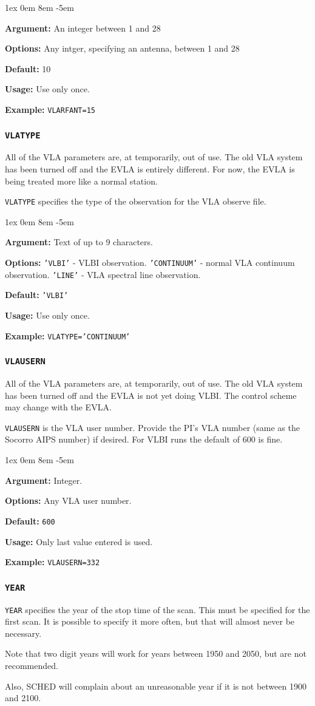 \documentclass{report}
\newcommand{\rcwbox}[5]{
  \begin{list}{}{\parsep 1ex  \itemsep 0em
                 \leftmargin 8em  \itemindent -5em }
    \item {\bf Argument:} #1
    \item {\bf Options:}  #2
    \item {\bf Default:}  #3
    \item {\bf Usage:}    #4
    \item {\bf Example:}  #5
  \end{list}
}
\begin{document}
\rcwbox
{An integer between 1 and 28}
{Any intger, specifying an antenna, between 1 and 28}
{10}
{Use only once.}
{{\tt VLARFANT=15}}



\subsubsection{\label{MP:VLATYPE}{\tt VLATYPE}}

All of the VLA parameters are, at temporarily, out of use.  The old
VLA system has been turned off and the EVLA is entirely different.
For now, the EVLA is being treated more like a normal station.

{\tt VLATYPE} specifies the type of the observation
for the VLA observe file.

\rcwbox
{Text of up to 9 characters.}
{{\tt 'VLBI'}      - VLBI observation.
 {\tt 'CONTINUUM'} - normal VLA continuum observation.
 {\tt 'LINE'}      - VLA spectral line observation.}
{{\tt 'VLBI'}}
{Use only once.}
{{\tt VLATYPE='CONTINUUM'}}


\subsubsection{\label{MP:VLAUSERN}{\tt VLAUSERN}}

All of the VLA parameters are, at temporarily, out of use.  The old
VLA system has been turned off and the EVLA is not yet doing VLBI.
The control scheme may change with the EVLA.

{\tt VLAUSERN} is the VLA user number. Provide the PI's VLA number
(same as the Socorro AIPS number) if desired. For VLBI runs the
default of 600 is fine.

\rcwbox
{Integer.}
{Any VLA user number.}
{{\tt 600}}
{Only last value entered is used.}
{{\tt VLAUSERN=332}}


\subsubsection{\label{MP:YEAR}{\tt YEAR}}

{\tt YEAR} specifies the year of the stop time of the scan. This must
be specified for the first scan.  It is possible to specify it more
often, but that will almost never be necessary.

Note that two digit years will work for years between 1950 and 2050,
but are not recommended.

Also, SCHED will complain about an unreasonable year if it is not between
1900 and 2100.
\end{document}
